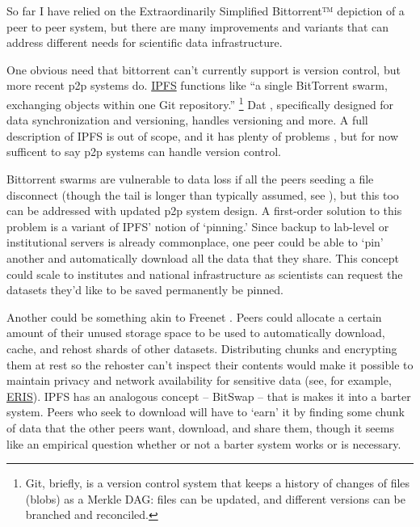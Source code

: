 \documentclass[11pt]{article}
\begin{document}
\begin{multicols}{2}
So far I have relied on the Extraordinarily Simplified Bittorrent™️
depiction of a peer to peer system, but there are many improvements and
variants that can address different needs for scientific data
infrastructure.

One obvious need that bittorrent can't currently support is version
control, but more recent p2p systems do. \href{https://ipfs.io/}{IPFS}
functions like ``a single BitTorrent swarm, exchanging objects within
one Git repository.'' \cite{benetIPFSContentAddressed2014} \footnote{Git, briefly, is a version control system that keeps a
  history of changes of files (blobs) as a Merkle DAG: files can be
  updated, and different versions can be branched and reconciled.} Dat
\cite{ogdenDatDistributedDataset2017} , specifically designed for
data synchronization and versioning, handles versioning and more. A full
description of IPFS is out of scope, and it has plenty of problems \cite{patsakisHydrasIPFSDecentralised2019} , but for now sufficent to
say p2p systems can handle version control.

Bittorrent swarms are vulnerable to data loss if all the peers seeding a
file disconnect (though the tail is longer than typically assumed, see
\cite{zhangUnravelingBitTorrentEcosystem2011} ), but this too can
be addressed with updated p2p system design. A first-order solution to
this problem is a variant of IPFS' notion of `pinning.' Since backup to
lab-level or institutional servers is already commonplace, one peer
could be able to `pin' another and automatically download all the data
that they share. This concept could scale to institutes and national
infrastructure as scientists can request the datasets they'd like to be
saved permanently be pinned.

Another could be something akin to Freenet \cite{clarkeFreenetDistributedAnonymous2001} . Peers could allocate a
certain amount of their unused storage space to be used to automatically
download, cache, and rehost shards of other datasets. Distributing
chunks and encrypting them at rest so the rehoster can't inspect their
contents would make it possible to maintain privacy and network
availability for sensitive data (see, for example,
\href{https://inqlab.net/projects/eris/}{ERIS}). IPFS has an analogous
concept -- BitSwap -- that is makes it into a barter system. Peers who
seek to download will have to `earn' it by finding some chunk of data
that the other peers want, download, and share them, though it seems
like an empirical question whether or not a barter system works or is
necessary.


\end{multicols}
\end{document}
